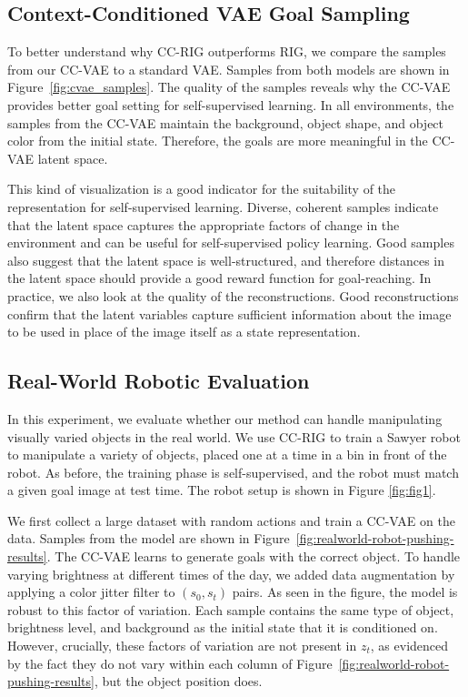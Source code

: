 \documentclass{article}
\begin{document}
\subsection{Context-Conditioned VAE Goal Sampling}

To better understand why CC-RIG outperforms RIG, we compare the samples from our CC-VAE to a standard VAE. Samples from both models are shown in Figure~\ref{fig:cvae_samples}.
The quality of the samples reveals why the CC-VAE provides better goal setting for self-supervised learning.
In all environments, the samples from the CC-VAE maintain the background, object shape, and object color from the initial state. Therefore, the goals are more meaningful in the CC-VAE latent space.

This kind of visualization is a good indicator for the suitability of the representation for self-supervised learning.
Diverse, coherent samples indicate that the latent space captures the appropriate factors of change in the environment and can be useful for self-supervised policy learning.
Good samples also suggest that the latent space is well-structured, and therefore distances in the latent space should provide a good reward function for goal-reaching. In practice, we also look at the quality of the reconstructions. Good reconstructions confirm that the latent variables capture sufficient information about the image to be used in place of the image itself as a state representation.

\subsection{Real-World Robotic Evaluation}
\label{sec:realworldexps}

In this experiment, we evaluate whether our method can handle manipulating visually varied objects in the real world. We use CC-RIG to train a Sawyer robot to manipulate a variety of objects, placed one at a time in a bin in front of the robot. As before, the training phase is self-supervised, and the robot must match a given goal image at test time. The robot setup is shown in Figure \ref{fig:fig1}.

We first collect a large dataset with random actions and train a CC-VAE on the data. Samples from the model are shown in Figure~\ref{fig:realworld-robot-pushing-results}.
The CC-VAE learns to generate goals with the correct object. To handle varying brightness at different times of the day, we added data augmentation by applying a color jitter filter to $(s_0, s_t)$ pairs.
As seen in the figure, the model is robust to this factor of variation. Each sample contains the same type of object, brightness level, and background as the initial state that it is conditioned on. However, crucially, these factors of variation are not present in $z_t$, as evidenced by the fact they do not vary within each column of Figure~\ref{fig:realworld-robot-pushing-results}, but the object position does.
\end{document}
